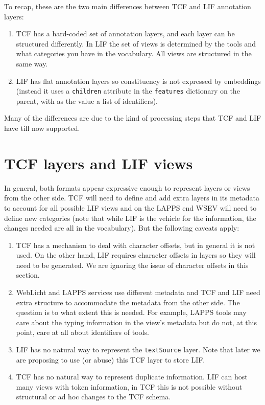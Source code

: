 \documentclass[11pt]{article}
\newcommand{\tag}[1]{{\tt #1}}
\begin{document}
To recap, these are the two main differences between TCF and LIF annotation layers:

\begin{enumerate}

\item TCF has a hard-coded set of annotation layers, and each layer can be structured differently. In LIF the set of views is determined by the tools and what categories you have in the vocabulary. All views are structured in the same way.

\item LIF has flat annotation layers so constituency is not expressed by embeddings (instead it uses a \tag{children} attribute in the \tag{features} dictionary on the parent, with as the value a list of identifiers).

\end{enumerate}

Many of the differences are due to the kind of processing steps that TCF and LIF have till now supported.


\section{TCF layers and LIF views}
\label{sec:layers-views}

In general, both formats appear expressive enough to represent layers or views from the other side. TCF will need to define and add extra layers in its metadata to account for all possible LIF views and on the LAPPS end WSEV will need to define new categories (note that while LIF is the vehicle for the information, the changes needed are all in the vocabulary). But the following caveats apply:

\begin{enumerate}

\item TCF has a mechanism to deal with character offsets, but in general it is not used. On the other hand, LIF requires character offsets in layers so they will need to be generated. We are ignoring the issue of character offsets in this section.

\item WebLicht and LAPPS services use different metadata and TCF and LIF need extra structure to accommodate the metadata from the other side. The question is to what extent this is needed. For example, LAPPS tools may care about the typing information in the view's metadata but do not, at this point, care at all about identifiers of tools. %

\item LIF has no natural way to represent the \tag{textSource} layer. Note that later we are proposing to use (or abuse) this TCF layer to store LIF.

\item TCF has no natural way to represent duplicate information. LIF can host many views with token information, in TCF this is not possible without structural or ad hoc changes to the TCF schema.

\end{enumerate}
\end{document}
